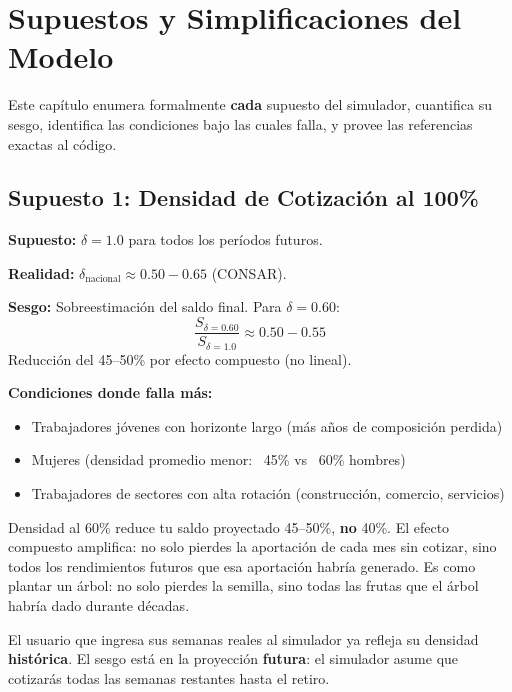 \documentclass[11pt,a4paper]{report}
\begin{document}

\chapter{Supuestos y Simplificaciones del Modelo}

Este cap\'itulo enumera formalmente \textbf{cada} supuesto del simulador, cuantifica su sesgo, identifica las condiciones bajo las cuales falla, y provee las referencias exactas al c\'odigo.

\section{Supuesto 1: Densidad de Cotizaci\'on al 100\%}

\begin{tcolorbox}[colback=blue!5!white, colframe=blue!75!black, title=\textbf{Definici\'on Formal}]
\textbf{Supuesto:} $\delta = 1.0$ para todos los per\'iodos futuros.

\textbf{Realidad:} $\delta_{\text{nacional}} \approx 0.50 - 0.65$ (CONSAR).

\textbf{Sesgo:} Sobreestimaci\'on del saldo final. Para $\delta = 0.60$:
\[
  \frac{S_{\delta=0.60}}{S_{\delta=1.0}} \approx 0.50 - 0.55
\]
Reducci\'on del 45--50\% por efecto compuesto (no lineal).

\textbf{Condiciones donde falla m\'as:}
\begin{itemize}
  \item Trabajadores j\'ovenes con horizonte largo (m\'as a\~nos de composici\'on perdida)
  \item Mujeres (densidad promedio menor: ~45\% vs ~60\% hombres)
  \item Trabajadores de sectores con alta rotaci\'on (construcci\'on, comercio, servicios)
\end{itemize}
\end{tcolorbox}

\begin{tcolorbox}[colback=green!5!white, colframe=green!50!black, title=\textbf{Intuici\'on}]
Densidad al 60\% reduce tu saldo proyectado 45--50\%, \textbf{no} 40\%. El efecto compuesto amplifica: no solo pierdes la aportaci\'on de cada mes sin cotizar, sino todos los rendimientos futuros que esa aportaci\'on habr\'ia generado. Es como plantar un \'arbol: no solo pierdes la semilla, sino todas las frutas que el \'arbol habr\'ia dado durante d\'ecadas.

El usuario que ingresa sus semanas reales al simulador ya refleja su densidad \textbf{hist\'orica}. El sesgo est\'a en la proyecci\'on \textbf{futura}: el simulador asume que cotizar\'as todas las semanas restantes hasta el retiro.
\end{tcolorbox}
\end{document}
